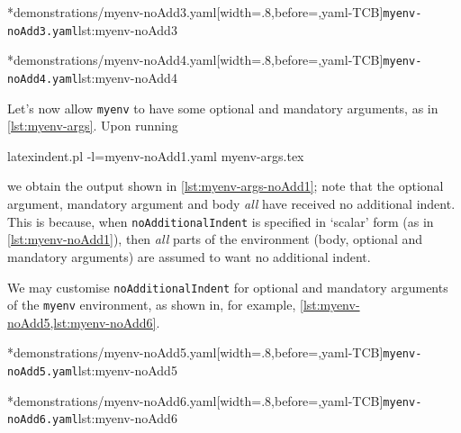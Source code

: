	\begin{minipage}{.45\textwidth}
		\cmhlistingsfromfile[style=yaml-LST]*{demonstrations/myenv-noAdd3.yaml}[width=.8\linewidth,before=\centering,yaml-TCB]{\texttt{myenv-noAdd3.yaml}}{lst:myenv-noAdd3}
	\end{minipage}
	\hfill
	\begin{minipage}{.45\textwidth}
		\cmhlistingsfromfile[style=yaml-LST]*{demonstrations/myenv-noAdd4.yaml}[width=.8\linewidth,before=\centering,yaml-TCB]{\texttt{myenv-noAdd4.yaml}}{lst:myenv-noAdd4}
	\end{minipage}


	Let's now allow \texttt{myenv} to have some optional and mandatory arguments, as
	in \cref{lst:myenv-args}.  Upon running
	\begin{commandshell}
latexindent.pl -l=myenv-noAdd1.yaml myenv-args.tex  
\end{commandshell}
	we obtain the output shown in \cref{lst:myenv-args-noAdd1}; note that the optional argument,
	mandatory argument and body \emph{all} have received no additional indent.
	This is because, when \texttt{noAdditionalIndent} is specified in `scalar' form (as in
	\cref{lst:myenv-noAdd1}), then \emph{all} parts of the environment (body,
	optional and mandatory arguments) are assumed to want no additional indent.

	We may customise \texttt{noAdditionalIndent} for optional and mandatory arguments of the
	\texttt{myenv} environment, as shown in, for example, \cref{lst:myenv-noAdd5,lst:myenv-noAdd6}.

	\begin{minipage}{.49\textwidth}
		\cmhlistingsfromfile[style=yaml-LST]*{demonstrations/myenv-noAdd5.yaml}[width=.8\linewidth,before=\centering,yaml-TCB]{\texttt{myenv-noAdd5.yaml}}{lst:myenv-noAdd5}
	\end{minipage}
	\hfill
	\begin{minipage}{.49\textwidth}
		\cmhlistingsfromfile[style=yaml-LST]*{demonstrations/myenv-noAdd6.yaml}[width=.8\linewidth,before=\centering,yaml-TCB]{\texttt{myenv-noAdd6.yaml}}{lst:myenv-noAdd6}
	\end{minipage}

